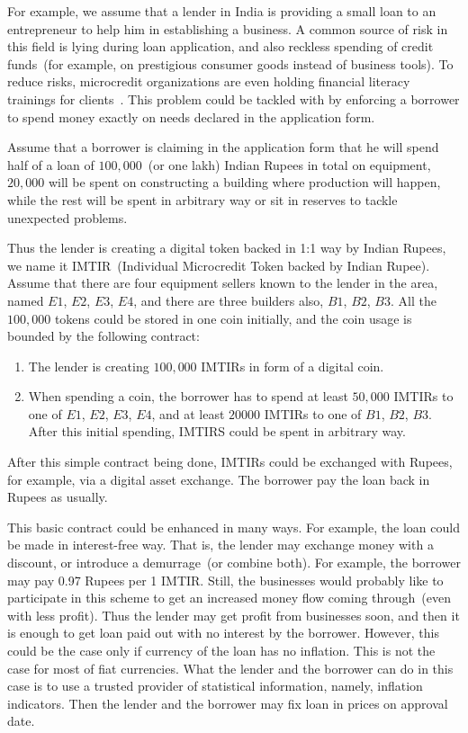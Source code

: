 \documentclass[]{llncs}   %
\begin{document}
 For example, we assume that a lender in India is providing a small loan to an entrepreneur to help him in establishing a business.
 A common source of risk in this field is lying during loan application, and also reckless spending of credit funds~(for example, on prestigious consumer goods instead of business tools). To reduce risks, microcredit
 organizations are even holding financial literacy trainings for clients~\cite{finliteracy}. This problem could be tackled with by  enforcing a borrower to spend money exactly on needs declared in the application form.  

 Assume that a borrower is claiming in the application form that he will spend half of a loan of $100,000$~(or one lakh) 
 Indian Rupees in total on equipment, $20,000$ will be spent on constructing a building where production will happen, while the rest will be spent in arbitrary way or sit in reserves to tackle unexpected problems.

 Thus the lender is creating a digital token backed in 1:1 way by Indian Rupees, we name it IMTIR~(Individual Microcredit Token backed by Indian Rupee). Assume that there are four equipment sellers known to the lender in the area, named $E1$, $E2$, $E3$, $E4$, and
 there are three builders also, $B1$, $B2$, $B3$. All the $100,000$ tokens could be stored in one coin initially, and the coin usage is bounded by the following contract:

 \begin{enumerate}
    \item{} The lender is creating $100,000$ IMTIRs in form of a digital coin.
    \item{} When spending a coin, the borrower has to spend at least $50,000$ IMTIRs to one of $E1$, $E2$, $E3$, $E4$, and
    at least $20000$ IMTIRs to one of $B1$, $B2$, $B3$. After this initial spending, IMTIRS could be spent in arbitrary way.
\end{enumerate}

 After this simple contract being done, IMTIRs could be exchanged with Rupees, for example, via a digital asset exchange. The borrower
 pay the loan back in Rupees as usually. 

 This basic contract could be enhanced in many ways. For example, the loan could be made in interest-free way. That is,
 the lender may exchange money with a discount, or introduce a demurrage~(or combine both). For example, the borrower may pay 
 0.97 Rupees per 1 IMTIR. Still, the businesses would probably like to participate in this scheme to get an increased money flow coming through~(even with less profit). Thus the lender may get profit from businesses soon, and then it is enough to get loan paid out with no interest by the borrower. However, this could be the case only if currency of the loan has no inflation. This is not the case for most of fiat currencies. What the lender and the borrower can do in this case is to use a trusted provider of statistical
 information, namely, inflation indicators. Then the lender and the borrower may fix loan in prices on approval date.
\end{document}
